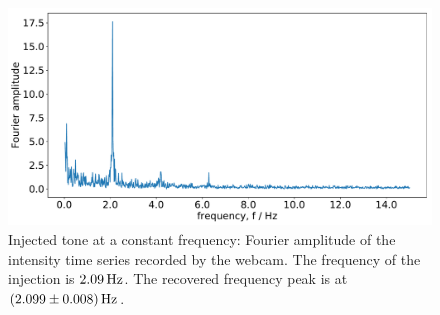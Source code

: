 \documentclass[paper-main.tex]{subfiles}
\begin{document}
\begin{figure}
	\includegraphics[width=.49\textwidth]{figures/webcam_expt_4_0209-cropped.pdf}
	\caption{\label{fig:webcam_spectrum}
Injected tone at a constant frequency: Fourier amplitude of the intensity time series recorded by the webcam. 
The frequency of the injection is $2.09\,{\rm Hz}$. 
The recovered frequency peak is at $(2.099\pm 0.008)\,{\rm Hz}$. 
}
	
\end{figure}
\end{document}
